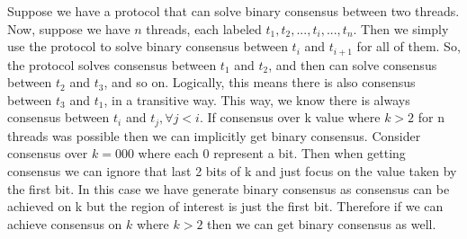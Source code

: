 \documentclass[11pt,letterpaper]{exam}
\begin{document}
\begin{questions}
		
		\question
		
		\question
		Suppose we have a protocol that can solve binary consensus between two threads.
		Now, suppose we have $n$ threads, each labeled $t_1, t_2, ..., t_i, ..., t_n$.
		Then we simply use the protocol to solve binary consensus between $t_i$ and $t_{i+1}$ for all of them.
		So, the protocol solves consensus between $t_1$ and $t_2$, and then can solve consensus between $t_2$ and $t_3$, and so on. 
		Logically, this means there is also consensus between $t_3$ and $t_1$, in a transitive way.
		This way, we know there is always consensus between $t_i$ and $t_j, \forall j < i$.
		\question
		If consensus over k value where $k>2$ for n threads was possible then we can implicitly get binary consensus. Consider consensus over $k=000$ where each 0 represent a bit. Then when getting consensus we can ignore that last 2 bits of k and just focus on the value taken by the first bit. In this case we have generate binary consensus as consensus can be achieved on k but the region of interest is just the first bit. Therefore if we can achieve consensus on $k$ where $k>2$ then we can get binary consensus as well.
	\end{questions}
	
\end{document}
